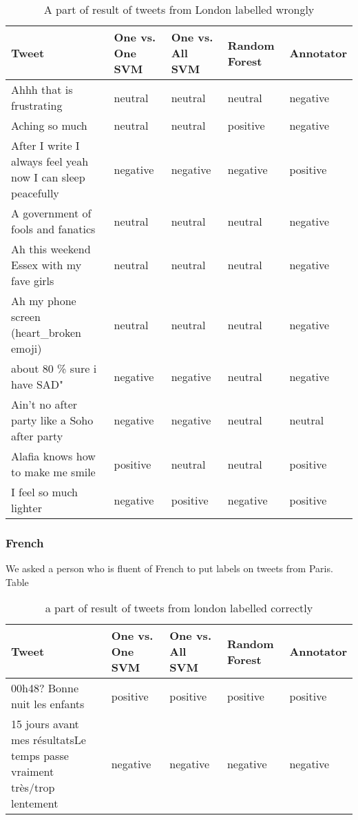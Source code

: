 \begin{table}[ht]
	\caption{A part of result of tweets from London labelled wrongly}
	\begin{tabular}{|p{5cm}|p{1.8cm}|p{1.8cm}|p{1.8cm}|p{1.8cm}|} \hline
	Tweet & One vs. One SVM &One vs. All SVM &Random Forest & Annotator\\ \hline
	Ahhh that is frustrating & neutral & neutral & neutral & negative\\ \hline
	Aching so much & neutral& neutral& positive & negative\\ \hline
	After I write I always feel yeah now I can sleep peacefully &negative&negative&negative&positive \\ \hline
	A government of fools and fanatics & neutral& neutral& neutral& negative \\ \hline
	Ah this weekend Essex with my fave girls & neutral& neutral& neutral& negative \\ \hline

	Ah my phone screen (heart\_broken emoji) & neutral & neutral& neutral& negative \\ \hline
	about 80 \% sure i have SAD" & negative & negative & neutral & negative\\ \hline
	Ain't no after party like a Soho after party & negative & negative & neutral & neutral \\ \hline
	Alafia knows how to make me smile & positive & neutral & neutral & positive \\ \hline
	I feel so much lighter & negative & positive & negative & positive \\ \hline

	\end{tabular}
	\label{tab:wrong_tweets_en}
\end{table}
\clearpage

\subsubsection{French}
We asked a person who is fluent of French to put labels on tweets from Paris.
Table 
\begin{table}[ht]
	\caption{a part of result of tweets from london labelled correctly}
	\begin{tabular}{|p{5cm}|p{1.8cm}|p{1.8cm}|p{1.8cm}|p{1.8cm}|} \hline
	Tweet & One vs. One SVM &One vs. All SVM &Random Forest & Annotator\\ \hline
	00h48? Bonne nuit les enfants &positive & positive &positive & positive \\ \hline
	15 jours avant mes r\'esultatsLe temps passe vraiment tr\`es/trop lentement & negative& negative& negative& negative \\ \hline
	\end{tabular}
	\label{tab:correct_tweets_fr}
\end{table}


